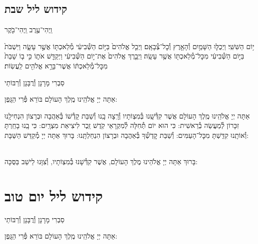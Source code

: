 \documentclass[twoside, openany, parskip=half, 11pt]{book}
\begin{document}
\section*{ קידוש ליל שבת }

\begin{small}וַֽיְהִי־עֶ֥רֶב וַֽיְהִי־בֹ֖קֶר\end{small}
י֥וֹם הַשִּׁשִּֽׁי׃ וַיְכֻלּ֛וּ הַשָּׁמַ֥יִם וְ֯הָאָ֖רֶץ וְ֯כׇל־צְ֯בָאָֽם׃ וַיְכַ֤ל אֱלֹהִים֙ בַּיּ֣וֹם הַשְּׁ֯בִיעִ֔י מְ֯לַאכְתּ֖וֹ אֲשֶׁ֣ר עָשָׂ֑ה וַיִּשְׁבֹּת֙ בַּיּ֣וֹם הַשְּׁ֯בִיעִ֔י מִכׇּל־מְ֯לַאכְתּ֖וֹ אֲשֶׁ֥ר עָשָֽׂה׃ וַיְבָ֤רֶךְ אֱלֹהִים֙ אֶת־י֣וֹם הַשְּׁ֯בִיעִ֔י וַיְקַדֵּ֖שׁ אֹת֑וֹ כִּ֣י ב֤וֹ שָׁבַת֙ מִכׇּל־מְ֯לַאכְתּ֔וֹ אֲשֶׁר־בָּרָ֥א אֱלֹהִ֖ים לַֽעֲשֽׂוֹת׃

\begin{footnotesize}
סַבְרִי מָרָנָן וְ֯רֲבָּנָן וְ֯רַבּוֹתַי\\
\end{footnotesize}
אַתָּה יְיָ אֱלֹהֵֽינוּ מֶֽלֶךְ הָעוֹלָם בּוֹרֵא פְּ֯רִי הַגָּֽפֶן:

אַתָּה יְיָ אֱלֹהֵֽינוּ מֶֽלֶךְ הָעוֹלָם אֲשֶׁר קִדְּ֯שָֽׁנוּ בְּ֯מִצְוֹתָיו וְ֯רָֽצָה בָֽנוּ וְ֯שַׁבַּת קָדְ֯שׁוֹ בְּ֯אַהֲבָה וּבְרָצוֹן הִנְחִילָֽנוּ זִכָּרוֹן לְ֯מַעֲשֵׂה בְ֯רֵאשִׁית: כִּי הוּא יוֹם תְּ֯חִלָּה לְ֯מִקְרָאֵי קֹֽדֶשׁ זֵֽכֶר לִיצִיאַת מִצְרָֽיִם: כִּי בָֽנוּ בָחַֽרְתָּ וְ֯אוֹתָֽנוּ קִדַּֽשְׁתָּ מִכׇּל־הָעַמִּים: וְ֯שַׁבַּת קׇדְשְׁ֯ךָ בְּ֯אַהֲבָה וּבְרָצוֹן הִנְחַלְתָּֽנוּ: בָּרוּךְ אַתָּה יְיָ מְ֯קַדֵּשׁ הַשַּׁבָּת:

\begin{sometimes}

\\
בָּרוּךְ אַתָּה יְיָ אֱלֹהֵינוּ מֶלֶךְ הָעוֹלָם, אֲשֶׁר קִדְּ֯שָׁנוּ בְּ֯מִצְוֹתָיו, וְ֯צִוָּנוּ לֵישֵׁב בַּסֻּכָּה:

\end{sometimes}

\chapter[קידוש ליל יום טוב]{ קידוש ליל יום טוב }
\label{kiddush leil yom tov}

\begin{footnotesize}
סַבְרִי מָרָנָן וְ֯רֲבָּנָן וְ֯רַבּוֹתַי\\
\end{footnotesize}
אַתָּה יְיָ אֱלֹהֵֽינוּ מֶֽלֶךְ הָעוֹלָם בּוֹרֵא פְּ֯רִי הַגָּֽפֶן:
\end{document}
